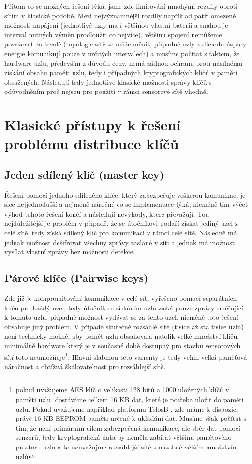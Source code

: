 \documentclass[11pt,final,twoside]{fithesis2}
\begin{document}
Přitom co se možných řešení týká, jsme zde limitování mnohými rozdíly oproti sítím v klasické podobě. Mezi nejvýznamnější rozdíly například
patří omezené možnosti napájení (jednotlivé uzly mají většinou vlastní baterii a snahou je interval nutných výměn prodloužit co nejvíce), 
většinu spojení nemůžeme považovat za trvalé (topologie sítě se může měnit, případně uzly z důvodu úspory energie komunikují pouze v určitých 
intervalech) a musíme počítat s faktem, že hardware uzlu, především z důvodu ceny, nemá žádnou ochranu proti násilnému získání obsahu paměti uzlu, 
tedy i případných kryptografických klíčů v paměti obsažených. Následují tedy jednotlivé klasické možnosti správy klíčů s odůvodněním proč nejsou pro 
použití v rámci sensorové sítě vhodné.

\section{Klasické přístupy k řešení problému distribuce klíčů}
\subsection{Jeden sdílený klíč (master key)} Řešení pomocí jednoho sdíleného klíče, který zabezpečuje veškerou komunikaci je sice nejjednodušší a 
nejméně náročné co se implementace týká, nicméně tím výčet výhod tohoto řešení končí a následují nevýhody, které převažují. Tou nejdůležitější 
je problém v případě, že se útočníkovi podaří získat jediný uzel z celé sítě, tedy získá sdílený klíč pro komunikaci v rámci celé sítě. Následně 
má jednak možnost dešifrovat všechny zprávy zaslané v síti a jednak má možnost vysílat vlastní zprávy bez možnosti detekce.

\subsection{Párové klíče (Pairwise keys)} Zde již je kompromitování komunikace v celé síti vyřešeno pomocí separátních klíčů pro každý uzel, 
tedy útočník se získáním uzlu získá pouze zprávy směřující k tomuto uzlu, případně možnost vydávat se za tento uzel, nicméně toto řešení 
obsahuje jiný problém. V případě skutečně rozsáhlé sítě (tisíce až sta tisíce uzlů) není technicky možné, aby paměť uzlu obsahovala natolik 
velké množství klíčů, minimálně hardware který je v současné době dostupný pro stavbu sensorových sítí toto neumožňuje\footnote{pokud uvažujeme 
AES \cite{Daemen1999} klíč o velikosti 128 bitů a 1000 uložených klíčů v paměti uzlu, dostáváme celkem 16 KB dat, které je potřeba uložit do paměti uzlu. 
Pokud uvažujeme například platformu TelosB \cite{MemsicInc.}, zde máme k dispozici právě 16 KB EEPROM paměti určené k ukládání dat. Musíme však počítat s 
tím, že není primárním cílem zabezpečená komunikace, ale sběr dat pomocí senzorů, tedy kryptografická data by neměla zabírat většinu paměťového prostoru 
uzlu a to neuvažujme rozsáhlejší sítě s násobně větším množstvím uzlů}. Hlavní slabinou této varianty je tedy velmi velká paměťová náročnost a obtížná 
škálovatelnost pro rozsáhlejší sítě. 
\end{document}
